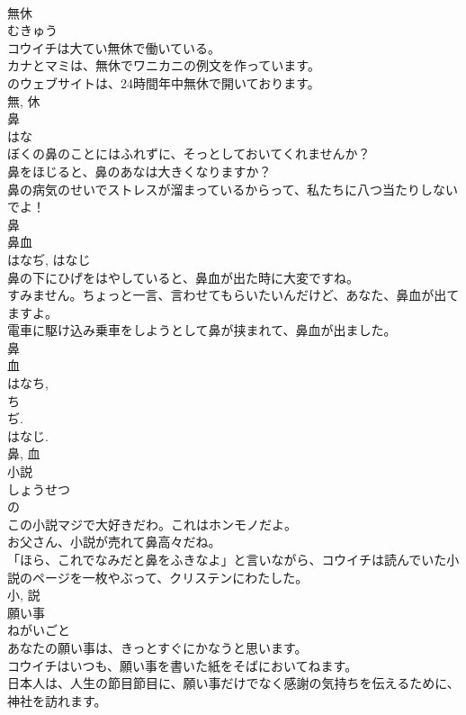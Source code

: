 \documentclass[8pt]{extreport}
\begin{document}
\begin{CJK}{UTF8}{min}
\\	無休	
\\	むきゅう	
\\	コウイチは大てい無休で働いている。	
\\	カナとマミは、無休でワニカニの例文を作っています。	
\\	のウェブサイトは、24時間年中無休で開いております。	
\\	無, 休	
\\	鼻	
\\	はな	
\\	ぼくの鼻のことにはふれずに、そっとしておいてくれませんか？	
\\	鼻をほじると、鼻のあなは大きくなりますか？	
\\	鼻の病気のせいでストレスが溜まっているからって、私たちに八つ当たりしないでよ！	
\\	鼻	
\\	鼻血	
\\	はなぢ, はなじ	
\\	鼻の下にひげをはやしていると、鼻血が出た時に大変ですね。	
\\	すみません。ちょっと一言、言わせてもらいたいんだけど、あなた、鼻血が出てますよ。	
\\	電車に駆け込み乗車をしようとして鼻が挟まれて、鼻血が出ました。	
\\	鼻
\\	血 
\\	はなち, 
\\	ち 
\\	ぢ. 
\\	はなじ. 
\\	鼻, 血	
\\	小説	
\\	しょうせつ	
\\	の 
\\	この小説マジで大好きだわ。これはホンモノだよ。	
\\	お父さん、小説が売れて鼻高々だね。	
\\	「ほら、これでなみだと鼻をふきなよ」と言いながら、コウイチは読んでいた小説のページを一枚やぶって、クリステンにわたした。	
\\	小, 説	
\\	願い事	
\\	ねがいごと	
\\	あなたの願い事は、きっとすぐにかなうと思います。	
\\	コウイチはいつも、願い事を書いた紙をそばにおいてねます。	
\\	日本人は、人生の節目節目に、願い事だけでなく感謝の気持ちを伝えるために、神社を訪れます。	

\end{CJK}
\end{document}
